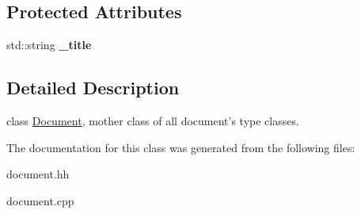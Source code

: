 \subsection*{Protected Attributes}
\begin{DoxyCompactItemize}
\item 
\hypertarget{classDocument_ac21a0c8503c8f62484fcbe319aa3c754}{
std::string {\bfseries \_\-title}}
\label{classDocument_ac21a0c8503c8f62484fcbe319aa3c754}

\end{DoxyCompactItemize}


\subsection{Detailed Description}
class \hyperlink{classDocument}{Document}, mother class of all document's type classes. 

The documentation for this class was generated from the following files:\begin{DoxyCompactItemize}
\item 
document.hh\item 
document.cpp\end{DoxyCompactItemize}
